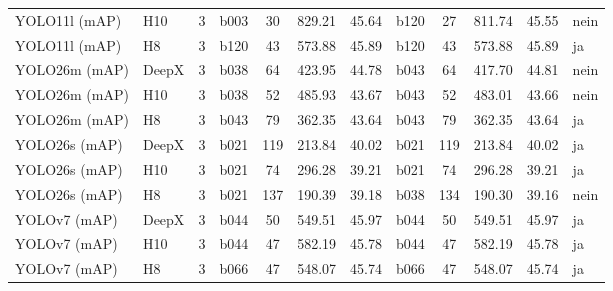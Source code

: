 \begin{longtable}{l l r l S[table-format=4.0] S[table-format=4.2] S[table-format=2.2] l S[table-format=4.0] S[table-format=4.2] S[table-format=2.2] l}
YOLO11l (mAP) & H10 & 3 & b003 & 30 & 829.21 & 45.64 & b120 & 27 & 811.74 & 45.55 & nein \\
YOLO11l (mAP) & H8 & 3 & b120 & 43 & 573.88 & 45.89 & b120 & 43 & 573.88 & 45.89 & ja \\
YOLO26m (mAP) & DeepX & 3 & b038 & 64 & 423.95 & 44.78 & b043 & 64 & 417.70 & 44.81 & nein \\
YOLO26m (mAP) & H10 & 3 & b038 & 52 & 485.93 & 43.67 & b043 & 52 & 483.01 & 43.66 & nein \\
YOLO26m (mAP) & H8 & 3 & b043 & 79 & 362.35 & 43.64 & b043 & 79 & 362.35 & 43.64 & ja \\
YOLO26s (mAP) & DeepX & 3 & b021 & 119 & 213.84 & 40.02 & b021 & 119 & 213.84 & 40.02 & ja \\
YOLO26s (mAP) & H10 & 3 & b021 & 74 & 296.28 & 39.21 & b021 & 74 & 296.28 & 39.21 & ja \\
YOLO26s (mAP) & H8 & 3 & b021 & 137 & 190.39 & 39.18 & b038 & 134 & 190.30 & 39.16 & nein \\
YOLOv7 (mAP) & DeepX & 3 & b044 & 50 & 549.51 & 45.97 & b044 & 50 & 549.51 & 45.97 & ja \\
YOLOv7 (mAP) & H10 & 3 & b044 & 47 & 582.19 & 45.78 & b044 & 47 & 582.19 & 45.78 & ja \\
YOLOv7 (mAP) & H8 & 3 & b066 & 47 & 548.07 & 45.74 & b066 & 47 & 548.07 & 45.74 & ja \\
\bottomrule
\end{longtable}
\endgroup
